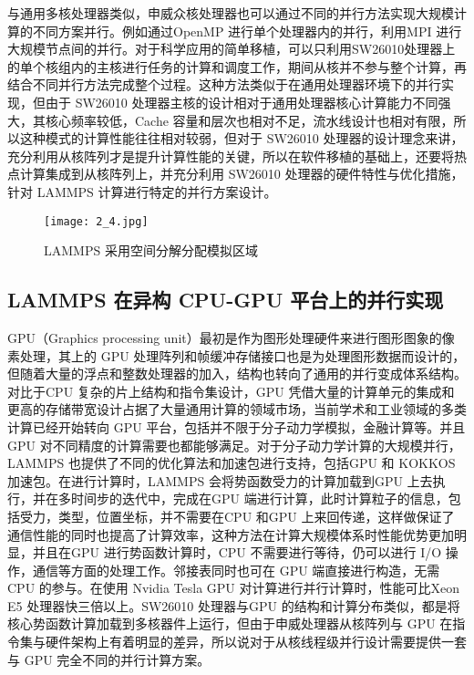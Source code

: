 与通用多核处理器类似，申威众核处理器也可以通过不同的并行方法实现大规模计算的不同方案并行。例如通过OpenMP 进行单个处理器内的并行，利用MPI 进行大规模节点间的并行。对于科学应用的简单移植，可以只利用SW26010处理器上的单个核组内的主核进行任务的计算和调度工作，期间从核并不参与整个计算，再结合不同并行方法完成整个过程。这种方法类似于在通用处理器环境下的并行实现，但由于 SW26010 处理器主核的设计相对于通用处理器核心计算能力不同强大，其核心频率较低，Cache 容量和层次也相对不足，流水线设计也相对有限，所以这种模式的计算性能往往相对较弱，但对于 SW26010 处理器的设计理念来讲，充分利用从核阵列才是提升计算性能的关键，所以在软件移植的基础上，还要将热点计算集成到从核阵列上，并充分利用 SW26010 处理器的硬件特性与优化措施，针对 LAMMPS 计算进行特定的并行方案设计。

 \begin{figure}[h]
  \centering
  \texttt{[image: 2\_4.jpg]}
  \caption{LAMMPS 采用空间分解分配模拟区域}
  \label{fig:badge}
\end{figure}

\subsection{LAMMPS 在异构 CPU-GPU 平台上的并行实现}
GPU（Graphics processing unit）最初是作为图形处理硬件来进行图形图象的像素处理，其上的 GPU 处理阵列和帧缓冲存储接口也是为处理图形数据而设计的，但随着大量的浮点和整数处理器的加入，结构也转向了通用的并行变成体系结构。对比于CPU 复杂的片上结构和指令集设计，GPU 凭借大量的计算单元的集成和更高的存储带宽设计占据了大量通用计算的领域市场，当前学术和工业领域的多类计算已经开始转向 GPU 平台，包括并不限于分子动力学模拟，金融计算等。并且 GPU 对不同精度的计算需要也都能够满足。对于分子动力学计算的大规模并行，LAMMPS 也提供了不同的优化算法和加速包进行支持，包括GPU 和 KOKKOS 加速包。在进行计算时，LAMMPS 会将势函数受力的计算加载到GPU 上去执行，并在多时间步的迭代中，完成在GPU 端进行计算，此时计算粒子的信息，包括受力，类型，位置坐标，并不需要在CPU 和GPU 上来回传递，这样做保证了通信性能的同时也提高了计算效率，这种方法在计算大规模体系时性能优势更加明显，并且在GPU 进行势函数计算时，CPU 不需要进行等待，仍可以进行 I/O 操作，通信等方面的处理工作。邻接表同时也可在 GPU 端直接进行构造，无需 CPU 的参与。在使用 Nvidia Tesla GPU 对计算进行并行计算时，性能可比Xeon E5 处理器快三倍以上。SW26010 处理器与GPU 的结构和计算分布类似，都是将核心势函数计算加载到多核器件上运行，但由于申威处理器从核阵列与 GPU 在指令集与硬件架构上有着明显的差异，所以说对于从核线程级并行设计需要提供一套与 GPU 完全不同的并行计算方案。

